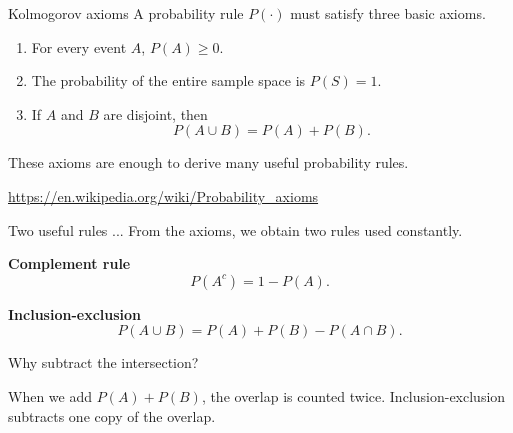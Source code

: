 \documentclass[12pt]{beamer}
\newcommand{\vocab}[1]{\textcolor{AggieMaroon}{\textbf{#1}}}
\begin{document}
\begin{frame}{}
\begin{block}{Kolmogorov axioms}
A probability rule $P(\cdot)$ must satisfy three basic axioms.

\begin{enumerate}
  \item For every event $A$, $P(A) \geq 0$.
  \item The probability of the entire sample space is $P(S)=1$.
  \item If $A$ and $B$ are disjoint, then
  \[
  P(A\cup B)=P(A)+P(B).
  \]
\end{enumerate}

\vspace{0.2cm}
These axioms are enough to derive many useful probability rules.
\end{block}
\url{https://en.wikipedia.org/wiki/Probability_axioms}
\end{frame}

\begin{frame}{}
\begin{block}{Two useful rules ...}
From the axioms, we obtain two rules used constantly.

\vspace{0.4cm}
\vocab{Complement rule}
\[
P(A^c)=1-P(A).
\]

\vocab{Inclusion-exclusion}
\[
P(A\cup B)=P(A)+P(B)-P(A\cap B).
\]
\end{block}
\end{frame}

\begin{frame}{}
\begin{block}{Why subtract the intersection?}
\vspace{0.4cm}
\centering
{}

\vspace{0.4cm}
When we add $P(A)+P(B)$, the overlap is counted twice. Inclusion-exclusion subtracts one copy of the overlap.
\end{block}
\end{frame}
\end{document}
